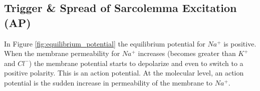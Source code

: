 
\subsection{Trigger \& Spread of Sarcolemma Excitation (AP)}

In Figure \ref{fig:equilibrium_potential} the equilibrium potential for $Na^+$ is positive. When the membrane permeability for $Na^+$ increases (becomes greater than $K^+$ and $Cl^-$) the membrane potential starts to depolarize and even to switch to a positive polarity. This is an action potential. At the molecular level, an action potential is the sudden increase in permeability of the membrane to $Na^+$.  

